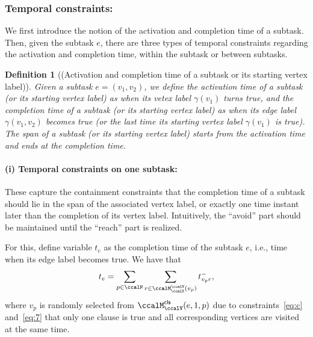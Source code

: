 \documentclass[Afour,sageh,times]{sagej}
\newtheorem{defn}[thm]{Definition}
\begin{document}
{{{\subsubsection{Temporal constraints:}\label{sec:temporal} We first introduce the notion of the activation and completion time of a subtask. Then, given the subtask $e$, there are three types of temporal constraints regarding the activation and completion time,  within the subtask or between subtasks.
\begin{defn}[(Activation and completion time of a subtask or its starting vertex label)]
Given a subtask $e = (v_1, v_2)$, we define the  activation time of a subtask (or its starting  vertex label) as when its vetex label $\gamma(v_1)$ turns true, and the completion time  of a subtask (or its starting vertex label) as when its edge label $\gamma(v_1, v_2)$ becomes true (or the last time its starting vertex label $\gamma(v_1)$ is true). The span of a subtask (or its starting vertex label) starts from the activation time and ends at the completion time.
\end{defn}
\paragraph{(i) Temporal constraints on one subtask:}\label{sec:onesubtask} These capture the containment constraints that the completion time of a subtask should lie in the span of the associated vertex label, or exactly one time instant later than the completion of its vertex label. Intuitively, the ``avoid'' part should be maintained until the ``reach'' part is realized.

For this, define variable  $t_e$ as the completion time of the subtask $e$, i.e., time when its edge label  becomes true. We have  that
\begingroup\makeatletter\def\f@size{10}\check@mathfonts
\def\maketag@@@#1{\hbox{\m@th\normalsize\normalfont#1}}%
\begin{align}\label{eq:edgetime}
  t_e = \sum_{p\in \ccalP} \sum_{r\in \ccalM^\ccalV_{\ccalK}(v_p)}t_{v_p r}^-,
\end{align}
\endgroup
where $v_p$ is randomly selected from $\ccalM^\mathsf{cls}_\ccalV(e,1,p)$ due to constraints~\eqref{eq:c} and~\eqref{eq:7} that only one clause is true and all corresponding vertices are visited at the same time.

}}}
\end{document}
